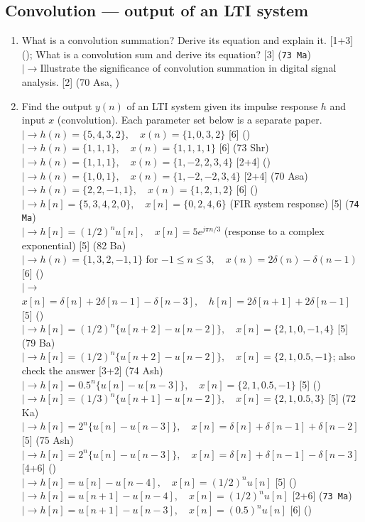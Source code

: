 \documentclass[12pt]{article}
\newcommand{\lb}{\\$\left|\rightarrow\right.$}
\begin{document}
  \subsection{Convolution --- output of an LTI system}
    \begin{enumerate}[topsep=0pt, noitemsep]
      \item What is a convolution summation? Derive its equation and explain it. \hfill [1+3] (); What is a convolution sum and derive its equation? \hfill [3] (\texttt{73 Ma})
        \lb Illustrate the significance of convolution summation in digital signal analysis. \hfill [2] (70 Asa, )

      \item Find the output $y(n)$ of an LTI system given its impulse response $h$ and input $x$ (convolution). Each parameter set below is a separate paper.
        \lb $h(n)=\{5,4,3,2\},\quad x(n)=\{1,0,3,2\}$ \hfill [6] ()
        \lb $h(n)=\{1,1,1\},\quad x(n)=\{1,1,1,1\}$ \hfill [6] (73 Shr)
        \lb $h(n)=\{1,1,1\},\quad x(n)=\{1,-2,2,3,4\}$ \hfill [2+4] ()
        \lb $h(n)=\{1,0,1\},\quad x(n)=\{1,-2,-2,3,4\}$ \hfill [2+4] (70 Asa)
        \lb $h(n)=\{2,2,-1,1\},\quad x(n)=\{1,2,1,2\}$ \hfill [6] ()
        \lb $h[n]=\{5,3,4,2,0\},\quad x[n]=\{0,2,4,6\}$ (FIR system response) \hfill [5] (\texttt{74 Ma})
        \lb $h[n]=(1/2)^n u[n],\quad x[n]=5e^{j\pi n/3}$ (response to a complex exponential) \hfill [5] (82 Ba)
        \lb $h(n)=\{1,3,2,-1,1\}$ for $-1\le n\le3,\quad x(n)=2\delta(n)-\delta(n-1)$ \hfill [6] ()
        \lb $x[n]=\delta[n]+2\delta[n-1]-\delta[n-3],\quad h[n]=2\delta[n+1]+2\delta[n-1]$ \hfill [5] ()
        \lb $h[n]=(1/2)^n\{u[n+2]-u[n-2]\},\quad x[n]=\{2,1,0,-1,4\}$ \hfill [5] (79 Ba)
        \lb $h[n]=(1/2)^n\{u[n+2]-u[n-2]\},\quad x[n]=\{2,1,0.5,-1\}$; also check the answer \hfill [3+2] (74 Ash)
        \lb $h[n]=0.5^n\{u[n]-u[n-3]\},\quad x[n]=\{2,1,0.5,-1\}$ \hfill [5] ()
        \lb $h[n]=(1/3)^n\{u[n+1]-u[n-2]\},\quad x[n]=\{2,1,0.5,3\}$ \hfill [5] (72 Ka)
        \lb $h[n]=2^n\{u[n]-u[n-3]\},\quad x[n]=\delta[n]+\delta[n-1]+\delta[n-2]$ \hfill [5] (75 Ash)
        \lb $h[n]=2^n\{u[n]-u[n-3]\},\quad x[n]=\delta[n]+\delta[n-1]-\delta[n-3]$ \hfill [4+6] ()
        \lb $h[n]=u[n]-u[n-4],\quad x[n]=(1/2)^n u[n]$ \hfill [5] ()
        \lb $h[n]=u[n+1]-u[n-4],\quad x[n]=(1/2)^n u[n]$ \hfill [2+6] (\texttt{73 Ma})
        \lb $h[n]=u[n+1]-u[n-3],\quad x[n]=(0.5)^n u[n]$ \hfill [6] ()

\end{enumerate}
\end{document}
